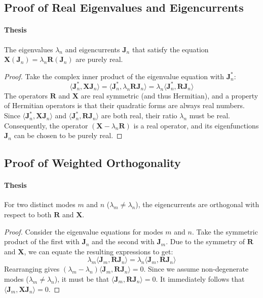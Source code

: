 \documentclass[11pt, a4paper]{report}
\begin{document}
\subsection{Proof of Real Eigenvalues and Eigencurrents} \label{ssec:proof_real}
\paragraph{Thesis} The eigenvalues $\lambda_n$ and eigencurrents $\mathbf{J}_n$ that satisfy the equation $\mathbf{X}(\mathbf{J}_n) = \lambda_n \mathbf{R}(\mathbf{J}_n)$ are purely real.
\begin{proof}
Take the complex inner product of the eigenvalue equation with $\mathbf{J}_n^*$:
\begin{equation}
    \langle \mathbf{J}_n^*, \mathbf{X}\mathbf{J}_n \rangle = \langle \mathbf{J}_n^*, \lambda_n \mathbf{R}\mathbf{J}_n \rangle = \lambda_n \langle \mathbf{J}_n^*, \mathbf{R}\mathbf{J}_n \rangle
\end{equation}
The operators $\mathbf{R}$ and $\mathbf{X}$ are real symmetric (and thus Hermitian), and a property of Hermitian operators is that their quadratic forms are always real numbers. Since $\langle \mathbf{J}_n^*, \mathbf{X}\mathbf{J}_n \rangle$ and $\langle \mathbf{J}_n^*, \mathbf{R}\mathbf{J}_n \rangle$ are both real, their ratio $\lambda_n$ must be real. Consequently, the operator $(\mathbf{X} - \lambda_n \mathbf{R})$ is a real operator, and its eigenfunctions $\mathbf{J}_n$ can be chosen to be purely real.
\end{proof}

\subsection{Proof of Weighted Orthogonality} \label{ssec:proof_ortho}
\paragraph{Thesis} For two distinct modes $m$ and $n$ ($\lambda_m \neq \lambda_n$), the eigencurrents are orthogonal with respect to both $\mathbf{R}$ and $\mathbf{X}$.
\begin{proof}
Consider the eigenvalue equations for modes $m$ and $n$. Take the symmetric product of the first with $\mathbf{J}_n$ and the second with $\mathbf{J}_m$. Due to the symmetry of $\mathbf{R}$ and $\mathbf{X}$, we can equate the resulting expressions to get:
\begin{equation}
    \lambda_m \langle \mathbf{J}_m, \mathbf{R}\mathbf{J}_n \rangle = \lambda_n \langle \mathbf{J}_m, \mathbf{R}\mathbf{J}_n \rangle
\end{equation}
Rearranging gives $(\lambda_m - \lambda_n) \langle \mathbf{J}_m, \mathbf{R}\mathbf{J}_n \rangle = 0$. Since we assume non-degenerate modes ($\lambda_m \neq \lambda_n$), it must be that $\langle \mathbf{J}_m, \mathbf{R}\mathbf{J}_n \rangle = 0$. It immediately follows that $\langle \mathbf{J}_m, \mathbf{X}\mathbf{J}_n \rangle = 0$.
\end{proof}
\end{document}
